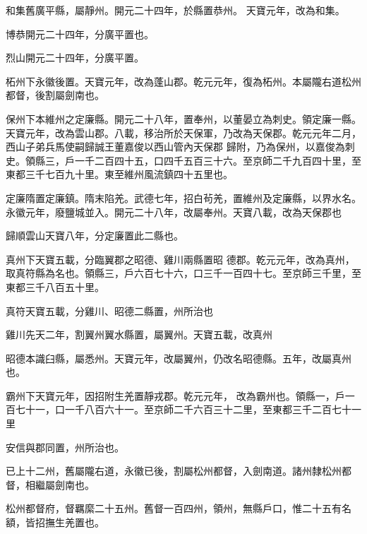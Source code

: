 \begin{pinyinscope}
 和集舊廣平縣，屬靜州。開元二十四年，於縣置恭州。
 天寶元年，改為和集。



 博恭開元二十四年，分廣平置也。



 烈山開元二十四年，分廣平置。



 柘州下永徽後置。天寶元年，改為蓬山郡。乾元元年，復為柘州。本屬隴右道松州都督，後割屬劍南也。



 保州下本維州之定廉縣。開元二十八年，置奉州，以董晏立為刺史。領定廉一縣。天寶元年，改為雲山郡。八載，移治所於天保軍，乃改為天保郡。乾元元年二月，西山子弟兵馬使嗣歸誠王董嘉俊以西山管內天保郡
 歸附，乃為保州，以嘉俊為刺史。領縣三，戶一千二百四十五，口四千五百三十六。至京師二千九百四十里，至東都三千七百九十里。東至維州風流鎮四十五里也。



 定廉隋置定廉鎮。隋末陷羌。武德七年，招白茍羌，置維州及定廉縣，以界水名。永徽元年，廢鹽城並入。開元二十八年，改屬奉州。天寶八載，改為天保郡也



 歸順雲山天寶八年，分定廉置此二縣也。



 真州下天寶五載，分臨翼郡之昭德、雞川兩縣置昭
 德郡。乾元元年，改為真州，取真符縣為名也。領縣三，戶六百七十六，口三千一百四十七。至京師三千里，至東都三千八百五十里。



 真符天寶五載，分雞川、昭德二縣置，州所治也



 雞川先天二年，割翼州翼水縣置，屬翼州。天寶五載，改真州



 昭德本識臼縣，屬悉州。天寶元年，改屬翼州，仍改名昭德縣。五年，改屬真州也。



 霸州下天寶元年，因招附生羌置靜戎郡。乾元元年，
 改為霸州也。領縣一，戶一百七十一，口一千八百六十一。至京師二千六百三十二里，至東都三千二百七十一里



 安信與郡同置，州所治也。



 已上十二州，舊屬隴右道，永徽已後，割屬松州都督，入劍南道。諸州隸松州都督，相繼屬劍南也。



 松州都督府，督羈縻二十五州。舊督一百四州，領州，無縣戶口，惟二十五有名額，皆招撫生羌置也。




\end{pinyinscope}
